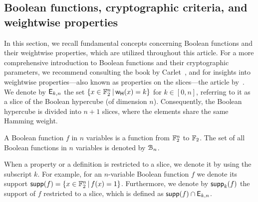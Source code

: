 \documentclass[11pt]{llncs}
\begin{document}

\subsection{Boolean functions, cryptographic criteria, and weightwise properties}
In this section, we recall fundamental concepts concerning Boolean functions and their weightwise properties, which are utilized throughout this article. For a more comprehensive introduction to Boolean functions and their cryptographic parameters, we recommend consulting the book by Carlet~\cite{Carlet20},
and for insights into weightwise properties—also known as properties on the slices—the article by~\cite{TOSC:CarMeaRot17}.
We denote by $\mathsf{E}_{k,n}$ the set $\{x\in \mathbb{F}_2^n \, | \, \mathsf{w_H}(x)=k \}$ for $k \in [0,n]$, referring to it as a slice of the Boolean hypercube (of dimension $n$). 
Consequently, the Boolean hypercube is divided into $n+1$ slices, where the elements share the same Hamming weight.


\begin{definition}\label{def:bool_f}
	A Boolean function $f$ in $n$ variables is a function from $\mathbb{F}_2^n$ to $\mathbb{F}_2$. 
	The set of all Boolean functions in $n$ variables is denoted by $\mathcal{B}_n$.%
\end{definition}


When a property or a definition is restricted to a slice, we denote it by using the subscript $k$. 
For example, for an $n$-variable Boolean function $f$ we denote its support $\mathsf{supp}(f)=\{x\in \mathbb{F}_2^n \, | \, f(x)=1  \}$. 
Furthermore, we denote by $\mathsf{supp}_{k}(f)$ the support of $f$ restricted to a slice, which is defined as $\mathsf{supp}(f)\cap \mathsf{E}_{k,n}$.
\end{document}
